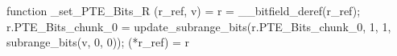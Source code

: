 function _set_PTE_Bits_R (r_ref, v) = {
    r = __bitfield_deref(r_ref);
    r.PTE_Bits_chunk_0 = update_subrange_bits(r.PTE_Bits_chunk_0, 1, 1, subrange_bits(v, 0, 0));
    (*r_ref) = r
}
